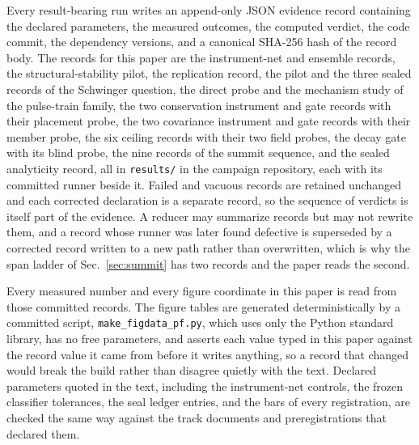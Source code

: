 \documentclass[aps,pre,reprint,nofootinbib,floatfix]{revtex4-2}
\begin{document}
Every result-bearing run writes an append-only JSON evidence record
containing the declared parameters, the measured outcomes, the computed
verdict, the code commit, the dependency versions, and a canonical
SHA-256 hash of the record body.  The records for this paper are the
instrument-net and ensemble records, the structural-stability pilot,
the replication record, the pilot and the three sealed records of the
Schwinger question, the direct probe and the mechanism study of the
pulse-train family, the two conservation instrument and gate records
with their placement probe, the two covariance instrument and gate
records with their member probe, the six ceiling records with their two
field probes, the decay gate with its blind probe, the nine records of
the summit sequence, and the sealed analyticity record, all in
\texttt{results/} in the campaign repository, each with its committed
runner beside it.  Failed and vacuous records are retained unchanged
and each corrected declaration is a separate record, so the sequence of
verdicts is itself part of the evidence.  A reducer may summarize
records but may not rewrite them, and a record whose runner was later
found defective is superseded by a corrected record written to a new
path rather than overwritten, which is why the span ladder of
Sec.~\ref{sec:summit} has two records and the paper reads the second.

Every measured number and every figure coordinate in this paper is read
from those committed records.  The figure tables are generated
deterministically by a committed script,
\texttt{make\_\allowbreak figdata\_\allowbreak pf.py}, which uses only
the Python standard library, has no free parameters, and asserts each
value typed in this paper against the record value it came from before
it writes anything, so a record that changed would break the build
rather than disagree quietly with the text.  Declared parameters quoted
in the text, including the instrument-net controls, the frozen
classifier tolerances, the seal ledger entries, and the bars of every
registration, are checked the same way against the track documents and
preregistrations that declared them.
\end{document}
